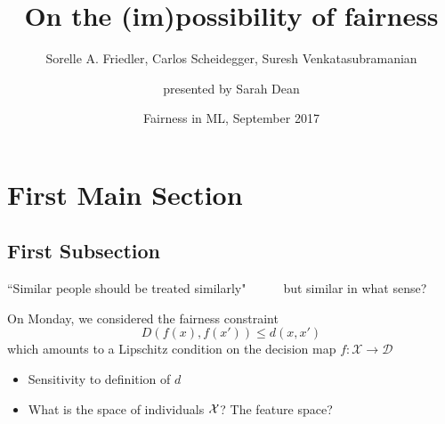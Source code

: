 \documentclass{beamer}
\title{On the (im)possibility of fairness}
\subtitle{Sorelle A. Friedler, Carlos Scheidegger, Suresh Venkatasubramanian}
\author{presented by Sarah Dean}
\date{Fairness in ML, September 2017}
\newcommand{\cX}{\mathcal{X}}
\newcommand{\cD}{\mathcal{D}}
\begin{document}
\begin{frame}
  \titlepage
\end{frame}


\section{First Main Section}

\subsection{First Subsection}

\begin{frame}{``Similar people should be treated similarly"}{~~~~~~but similar in what sense?}

On Monday, we considered the fairness constraint
\[D(f(x),f(x')) \leq d(x,x')\]
which amounts to a Lipschitz condition on the decision map $f:\cX\to \cD$
\pause

  \begin{itemize}
  \item {
    Sensitivity to definition of $d$
  }
  \item{
    What is the space of individuals $\cal{X}$? The feature space?
  }
  \end{itemize}
\end{frame}
\end{document}
